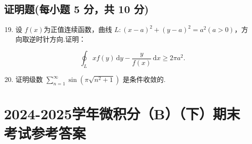 \documentclass[../main.tex]{subfiles}
\begin{document}
\section{证明题(每小题 5 分，共 10 分)}
\begin{enumerate}
  \setcounter{enumi}{18}
  \item 设 \(f(x) \)为正值连续函数，曲线 \( L:(x-a)^2+(y-a)^2=a^2(a>0) \)，方向取逆时针方向.证明：

        \[\displaystyle \oint_L xf(y)\,\mathrm{d}y-\dfrac{y}{f(x)}\,\mathrm{d}x \geq 2\pi a^2.\]
        \vspace{10em}

  \item 证明级数 \( \displaystyle \sum \limits_{n=1}^{\infty} \sin\left({\pi \sqrt{n^2+1}}\right) \) 是条件收敛的.
        \vspace{10em}
\end{enumerate}
\chapter{2024-2025学年微积分（B）（下）期末考试参考答案}
\end{document}
